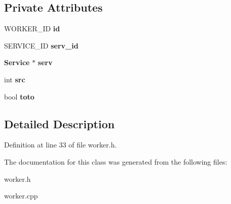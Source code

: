 \subsection*{Private Attributes}
\begin{CompactItemize}
\item 
WORKER\_\-ID {\bf id}\label{class_worker_b5ffcb995e12fa71b9551e91729d6972}

\item 
SERVICE\_\-ID {\bf serv\_\-id}\label{class_worker_d7dc76e301fd2bcf5d3a2088a59f1378}

\item 
{\bf Service} $\ast$ {\bf serv}\label{class_worker_454e1764ed165af733cc44a73e395692}

\item 
int {\bf src}\label{class_worker_895c3ebc198018ea3391c09bc802d2f6}

\item 
bool {\bf toto}\label{class_worker_7ba5a18b2918cf9e704536b763be37f7}

\end{CompactItemize}


\subsection{Detailed Description}




Definition at line 33 of file worker.h.

The documentation for this class was generated from the following files:\begin{CompactItemize}
\item 
worker.h\item 
worker.cpp\end{CompactItemize}
